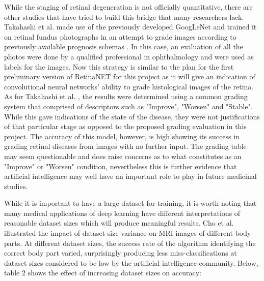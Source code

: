 \documentclass[a4paper]{article}
\begin{document}
        While the staging of retinal degeneration is not officially quantitative, there are other studies that have tried to build this bridge that many researchers lack. Takahashi et al. made use of the previously developed GoogLeNet and trained it on retinal fundus photographs in an attempt to grade images according to previously available prognosis schemas \cite{RN16}. In this case, an evaluation of all the photos were done by a qualified professional in ophthalmology and were used as labels for the images. Now this strategy is similar to the plan for the first preliminary version of RetinaNET for this project as it will give an indication of convolutional neural networks' ability to grade histological images of the retina. As for Takahashi et al. \cite{RN16}, the results were determined using a common grading system that comprised of descriptors such as "Improve", "Worsen" and "Stable". While this gave indications of the state of the disease, they were not justifications of that particular stage as opposed to the proposed grading evaluation in this project. The accuracy of this model, however, is high showing its success in grading retinal diseases from images with no further input. The grading table may seem questionable and does raise concerns as to what constitutes as an "Improve" or "Worsen" condition, nevertheless this is further evidence that artificial intelligence may well have an important role to play in future medicinal studies.
        \vspace{3mm}

        While it is important to have a large dataset for training, it is worth noting that many medical applications of deep learning have different interpretations of reasonable dataset sizes which will produce meaningful results. Cho et al. \cite{RN14} illustrated the impact of dataset size variance on MRI images of different body parts. At different dataset sizes, the success rate of the algorithm identifying the correct body part varied, surprisingly producing less miss-classifications at dataset sizes considered to be low by the artificial intelligence community. Below, table 2 shows the effect of increasing dataset sizes on accuracy:
\end{document}
